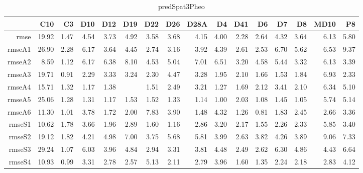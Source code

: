 \begin{table}[H]
\centering
\begin{tabular}{rrrrrrrrrrrrrrrr}
  \hline
 & C10 & C3 & D10 & D12 & D19 & D22 & D26 & D28A & D4 & D41 & D6 & D7 & D8 & MD10 & P8 \\ 
  \hline
rmse & 19.92 & 1.47 & 4.54 & 3.73 & 4.92 & 3.58 & 3.68 & 4.15 & 4.00 & 2.28 & 2.64 & 4.32 & 3.64 & 6.13 & 5.80 \\ 
  rmseA1 & 26.90 & 2.28 & 6.17 & 3.64 & 4.45 & 2.74 & 3.16 & 3.92 & 4.39 & 2.61 & 2.53 & 6.70 & 5.62 & 6.53 & 9.37 \\ 
  rmseA2 & 8.59 & 1.12 & 6.17 & 6.38 & 8.10 & 4.53 & 5.04 & 7.01 & 6.51 & 3.20 & 4.58 & 5.44 & 3.32 & 6.13 & 3.39 \\ 
  rmseA3 & 19.71 & 0.91 & 2.29 & 3.33 & 3.24 & 2.30 & 4.47 & 3.28 & 1.95 & 2.10 & 1.66 & 1.53 & 1.84 & 6.93 & 2.33 \\ 
  rmseA4 & 15.71 & 1.32 & 1.17 & 1.38 &  & 1.51 & 2.49 & 3.21 & 1.27 & 1.69 & 2.12 & 3.41 & 2.10 & 6.34 & 5.10 \\ 
  rmseA5 & 25.06 & 1.28 & 1.31 & 1.17 & 1.53 & 1.52 & 1.33 & 1.14 & 1.00 & 2.03 & 1.08 & 1.45 & 1.05 & 5.74 & 5.14 \\ 
  rmseA6 & 11.30 & 1.01 & 3.78 & 1.72 & 2.00 & 7.83 & 3.90 & 1.48 & 4.32 & 1.26 & 0.81 & 1.83 & 2.45 & 2.66 & 3.36 \\ 
  rmseS1 & 10.62 & 1.78 & 3.66 & 1.96 & 2.89 & 1.60 & 1.16 & 2.86 & 3.20 & 2.17 & 1.55 & 2.26 & 2.33 & 5.85 & 3.40 \\ 
  rmseS2 & 19.12 & 1.82 & 4.21 & 4.98 & 7.00 & 3.75 & 5.68 & 5.81 & 3.99 & 2.63 & 3.82 & 4.26 & 3.89 & 9.06 & 7.33 \\ 
  rmseS3 & 29.24 & 1.07 & 6.03 & 3.96 & 4.84 & 2.94 & 3.31 & 3.81 & 4.48 & 2.49 & 2.62 & 6.30 & 4.86 & 4.43 & 6.64 \\ 
  rmseS4 & 10.93 & 0.99 & 3.31 & 2.78 & 2.57 & 5.13 & 2.11 & 2.79 & 3.96 & 1.60 & 1.35 & 2.24 & 2.18 & 2.83 & 4.12 \\ 
   \hline
\end{tabular}
\caption{predSpat3Pheo} 
\end{table}
